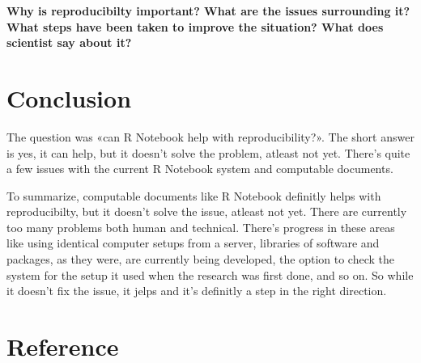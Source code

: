 \documentclass[
  12pt,
  twoside]{article}
\begin{document}
\textbf{Why is reproducibilty important? What are the issues surrounding
it? What steps have been taken to improve the situation? What does
scientist say about it?}

\hypertarget{conclusion}{%
\section{Conclusion}\label{conclusion}}

The question was «can R Notebook help with reproducibility?». The short
answer is yes, it can help, but it doesn't solve the problem, atleast
not yet. There's quite a few issues with the current R Notebook system
and computable documents.

To summarize, computable documents like R Notebook definitly helps with
reproducibilty, but it doesn't solve the issue, atleast not yet. There
are currently too many problems both human and technical. There's
progress in these areas like using identical computer setups from a
server, libraries of software and packages, as they were, are currently
being developed, the option to check the system for the setup it used
when the research was first done, and so on. So while it doesn't fix the
issue, it jelps and it's definitly a step in the right direction.

\hypertarget{reference}{%
\section{Reference}\label{reference}}
\end{document}

